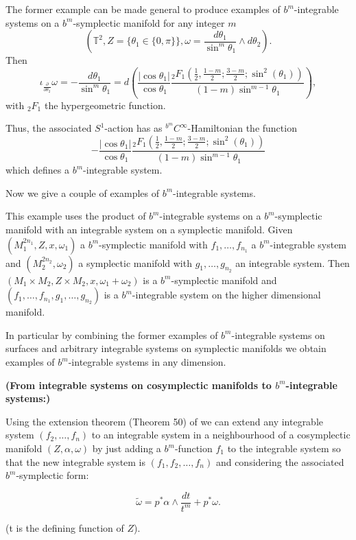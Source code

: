 \begin{example} \label{ex:bmtorus}
The former example can be made general to produce examples of $b^m$-integrable systems on a $b^m$-symplectic manifold for any integer $m$
\[
(\mathbb{T}^2, Z = \{\theta_1 \in \{0, \pi\}\}, \omega=  \frac{d\theta_1}{\sin^m\theta_1}\wedge d\theta_2).
\]
Then 
$$\iota_{\frac{\partial}{\partial\theta_2}}\omega = - \frac{d \theta_1}{\sin^m \theta_1} = d\left(\frac{|\cos\theta_1|}{\cos\theta_1} \frac{_2F_1 \left ( \frac{1}{2}, \frac{1 - m}{2}; \frac{3 - m}{2}; \sin^2(\theta_1) \right )}{(1-m) \sin^{m - 1} \theta_1}\right),$$
with $_2F_1$  the hypergeometric function. 

Thus, the associated $S^1$-action has as  $^{b^m}C^{\infty}$-Hamiltonian the function 
$$- \frac{|\cos\theta_1|}{\cos\theta_1} \frac{_2F_1 \left ( \frac{1}{2}, \frac{1 - m}{2}; \frac{3 - m}{2}; \sin^2(\theta_1) \right )}{(1-m) \sin^{m - 1} \theta_1}$$ \noindent which defines a $b^m$-integrable system.
\end{example}
Now we give a couple  of examples of $b^m$-integrable systems.


\begin{example}
This example uses the product of $b^m$-integrable systems on a $b^m$-symplectic manifold with an integrable system on a symplectic manifold. Given $(M_1^{2n_1}, Z,x,\omega_1)$ a $b^m$-symplectic manifold with $f_1,\ldots,f_{n_1}$ a $b^m$-integrable system and $(M_2^{2n_2},\omega_2)$ a symplectic manifold with $g_1,\ldots,g_{n_2}$ an integrable system. Then $(M_1\times M_2, Z\times M_2, x, \omega_1 + \omega_2)$ is a $b^m$-symplectic manifold and $(f_1,\ldots,f_{n_1},g_1,\ldots,g_{n_2})$ is a $b^m$-integrable system on the higher dimensional manifold.

In particular by combining the former examples of $b^m$-integrable systems on surfaces and arbitrary integrable systems on symplectic manifolds we obtain examples of $b^m$-integrable systems in any dimension.
\end{example}


\begin{example}\textbf{(From integrable systems on cosymplectic manifolds to $b^m$-integrable systems:)}

Using the extension theorem (Theorem 50) of \cite{GMP14} we can extend any integrable system $(f_2,\dots, f_n)$ to an integrable system in a neighbourhood of a cosymplectic manifold $(Z, \alpha, \omega) $ by just adding a $b^m$-function $f_1$ to the integrable system so that the new integrable system is $(f_1, f_2,\dots, f_n)$  and considering the associated $b^m$-symplectic form:

\begin{equation}\label{eq:normalform}\tilde{\omega}=p^*\alpha\wedge\frac{dt}{t^m}+p^*\omega. \end{equation}

(t is the defining function of $Z$).

\end{example}

